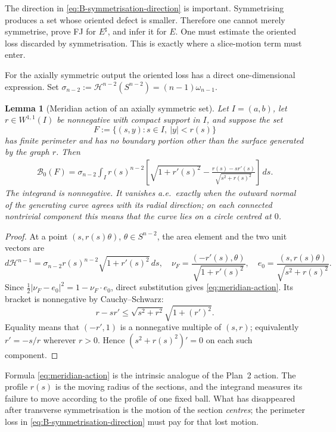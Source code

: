 \documentclass[11pt]{amsart}
\newtheorem{lemma}[theorem]{Lemma}
\theoremstyle{definition}
\newcommand{\Hn}{\mathcal H^{n-1}}
\begin{document}
The direction in \eqref{eq:B-symmetrisation-direction} is important.
Symmetrising produces a set whose oriented defect is smaller.  Therefore
one cannot merely symmetrise, prove FJ for \(E^\sharp\), and infer it for
\(E\).  One must estimate the oriented loss discarded by
symmetrisation.  This is exactly where a slice-motion term must enter.

For the axially symmetric output the oriented loss has a direct
one-dimensional expression.  Set
\(\sigma_{n-2}:=\mathcal H^{n-2}(S^{n-2})=(n-1)\omega_{n-1}\).

\begin{lemma}[Meridian action of an axially symmetric set]
\label{lem:meridian-action}
Let \(I=(a,b)\), let \(r\in W^{1,1}(I)\) be nonnegative with compact
support in \(I\), and suppose the set
\[
   F:=\{(s,y):s\in I,\ |y|<r(s)\}
\]
has finite perimeter and has no boundary portion other than the surface
generated by the graph \(r\).  Then
\[
\begin{aligned}
   \mathcal B_0(F)
   =\sigma_{n-2}\int_I r(s)^{n-2}
       \left[
          \sqrt{1+r'(s)^2}
          -\frac{r(s)-s r'(s)}
                 {\sqrt{s^2+r(s)^2}}
       \right]\,ds .
\end{aligned}
\tag{6.6}\label{eq:meridian-action}
\]
The integrand is nonnegative.  It vanishes a.e.\ exactly when the
outward normal of the generating curve agrees with its radial direction;
on each connected nontrivial component this means that the curve lies on
a circle centred at \(0\).
\end{lemma}

\begin{proof}
At a point \((s,r(s)\theta)\), \(\theta\in S^{n-2}\), the area element
and the two unit vectors are
\[
   d\Hn=\sigma_{n-2}r(s)^{n-2}\sqrt{1+r'(s)^2}\,ds,
\quad
   \nu_F=\frac{(-r'(s),\theta)}{\sqrt{1+r'(s)^2}},
\quad
   e_0=\frac{(s,r(s)\theta)}{\sqrt{s^2+r(s)^2}}.
\]
Since \(\tfrac12|\nu_F-e_0|^2=1-\nu_F\cdot e_0\), direct substitution
gives \eqref{eq:meridian-action}.  Its bracket is nonnegative by
Cauchy--Schwarz:
\[
   r-sr'\le\sqrt{s^2+r^2}\sqrt{1+(r')^2}.
\]
Equality means that \((-r',1)\) is a nonnegative multiple of
\((s,r)\); equivalently \(r'=-s/r\) wherever \(r>0\).  Hence
\((s^2+r(s)^2)'=0\) on each such component.
\end{proof}

Formula \eqref{eq:meridian-action} is the intrinsic analogue of the
Plan~2 action.  The profile \(r(s)\) is the moving radius of the
sections, and the integrand measures its failure to move according to
the profile of one fixed ball.  What has disappeared after transverse
symmetrisation is the motion of the section \emph{centres}; the
perimeter loss in \eqref{eq:B-symmetrisation-direction} must pay for
that lost motion.
\end{document}
